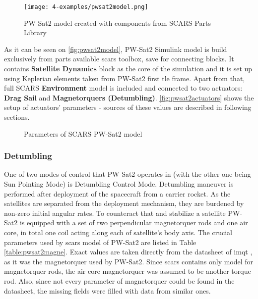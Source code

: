         \begin{figure}[H]
            \centering
            \texttt{[image: 4-examples/pwsat2model.png]}
            \caption{PW-Sat2 model created with components from SCARS Parts Library}
            \label{fig:pwsat2model}
        \end{figure}

        As it can be seen on \autoref{fig:pwsat2model}, PW-Sat2 Simulink model is build exclusively from parts available \ac{scars} toolbox, save for connecting blocks. It contains \textbf{Satellite Dynamics} block as the core of the simulation and it is set up using Keplerian elements taken from PW-Sat2 first \ac{tle} frame. Apart from that, full SCARS \textbf{Environment} model is included and connected to two actuators: \textbf{Drag Sail} and \textbf{Magnetorquers (Detumbling)}. \autoref{fig:pwsat2actuators} shows the setup of actuators' parameters - sources of these values are described in following sections. 

        
        \begin{figure}[H]
            \centering
            \quad
            \caption{Parameters of SCARS PW-Sat2 model}%
            \label{fig:pwsat2actuators}%
        \end{figure}

        \subsubsection{Detumbling}
            One of two modes of control that PW-Sat2 operates in (with the other one being Sun Pointing Mode) is Detumbling Control Mode. Detumbling maneuver is performed after deployment of the spacecraft from a carrier rocket. As the satellites are separated from the deployment mechanism, they are burdened by non-zero initial angular rates. To counteract that and stabilize a satellite PW-Sat2 is equipped with a set of two perpendicular magnetorquer rods and one air core, in total one coil acting along each of satellite's body axis. The crucial parameters used by \ac{scars} model of PW-Sat2 are listed in Table \ref{table:pwsat2magne}.\cite{pwsat2adcs} Exact values are taken directly from the datasheet of \ac{imqt} \cite{imqt-datasheet}, as it was the magnetorquer used by PW-Sat2. Since \ac{scars} contains only model for magnetorquer rods, the air core magnetorquer was assumed to be another torque rod. Also, since not every parameter of magnetorquer could be found in the datasheet, the missing fields were filled with data from similar ones.

